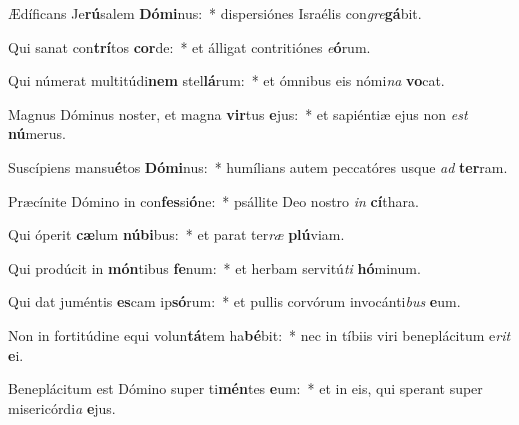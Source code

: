 \item Ædíficans Je\textbf{rú}salem \textbf{Dó}\textbf{mi}nus:~* dispersiónes Israélis con\textit{gre}\textbf{gá}bit.
\item Qui sanat con\textbf{trí}tos \textbf{cor}de:~* et álligat contritiónes \textit{e}\textbf{ó}rum.
\item Qui númerat multitúdi\textbf{nem} stel\textbf{lá}rum:~* et ómnibus eis nómi\textit{na} \textbf{vo}cat.
\item Magnus Dóminus noster, et magna \textbf{vir}tus \textbf{e}jus:~* et sapiéntiæ ejus non \textit{est} \textbf{nú}merus.
\item Suscípiens mansu\textbf{é}tos \textbf{Dó}\textbf{mi}nus:~* humílians autem peccatóres usque \textit{ad} \textbf{ter}ram.
\item Præcínite Dómino in con\textbf{fes}si\textbf{ó}ne:~* psállite Deo nostro \textit{in} \textbf{cí}thara.
\item Qui óperit \textbf{cæ}lum \textbf{nú}\textbf{bi}bus:~* et parat ter\textit{ræ} \textbf{plú}viam.
\item Qui prodúcit in \textbf{món}tibus \textbf{fe}num:~* et herbam servitú\textit{ti} \textbf{hó}minum.
\item Qui dat juméntis \textbf{es}cam ip\textbf{só}rum:~* et pullis corvórum invocánti\textit{bus} \textbf{e}um.
\item Non in fortitúdine equi volun\textbf{tá}tem ha\textbf{bé}bit:~* nec in tíbiis viri beneplácitum e\textit{rit} \textbf{e}i.
\item Beneplácitum est Dómino super ti\textbf{mén}tes \textbf{e}um:~* et in eis, qui sperant super misericórdi\textit{a} \textbf{e}jus.
